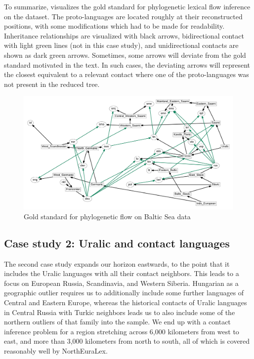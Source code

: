 To summarize,  visualizes the gold standard for phylogenetic lexical flow inference on the dataset. The proto-languages are located roughly at their reconstructed positions, with some modifications which had to be made for readability. Inheritance relationships are visualized with black arrows, bidirectional contact with light green lines (not in this case study), and unidirectional contacts are shown as dark green arrows. Sometimes, some arrows will deviate from the gold standard motivated in the text. In such cases, the deviating arrows will represent the closest equivalent to a relevant contact where one of the proto-languages was not present in the reduced tree.

\begin{figure}
\includegraphics[width=\textwidth]{figures/goldstandard-phylo-baltic.pdf}
\caption{Gold standard for phylogenetic flow on Baltic Sea data}
\label{baltic-goldstandard-phylo}
\end{figure}

\subsection{Case study 2: Uralic and contact languages}
The second case study expands our horizon eastwards, to the point that it includes the Uralic languages with all their contact neighbors. This leads to a focus on European Russia, Scandinavia, and Western Siberia. Hungarian as a geographic outlier requires us to additionally include some further languages of Central and Eastern Europe, whereas the historical contacts of Uralic languages in Central Russia with Turkic neighbors leads us to also include some of the northern outliers of that family into the sample. We end up with a contact inference problem for a region stretching across 6,000 kilometers from west to east, and more than 3,000 kilometers from north to south, all of which is covered reasonably well by NorthEuraLex.


